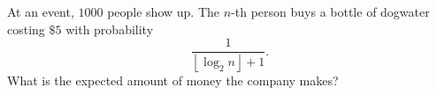 At an event, $1000$ people show up. The $n$-th person buys a bottle of dogwater costing $\$5$ with probability
\[\dfrac{1}{\left\lfloor\log_2 n\right\rfloor+1}.\]
What is the expected amount of money the company makes?
